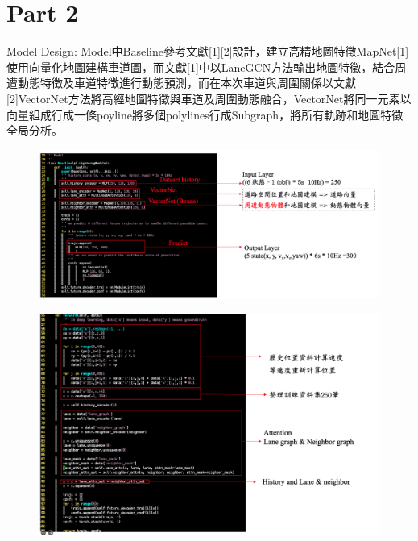 \documentclass{article}
\begin{document}
\section{Part 2}

Model Design:
Model中Baseline參考文獻[1][2]設計，建立高精地圖特徵MapNet[1]使用向量化地圖建構車道圖，而文獻[1]中以LaneGCN方法輸出地圖特徵，結合周遭動態特徵及車道特徵進行動態預測，而在本次車道與周圍關係以文獻[2]VectorNet方法將高經地圖特徵與車道及周圍動態融合，VectorNet將同一元素以向量組成行成一條poyline將多個polylines行成Subgraph，將所有軌跡和地圖特徵全局分析。
\begin{figure}[H]
	\centering
	\includegraphics[scale=0.3]{./model1.png}
\end{figure}

\begin{figure}[H]
	\centering
	\includegraphics[scale=0.3]{./model2.png}
\end{figure}
\end{document}
